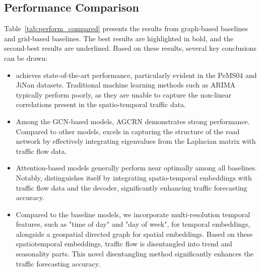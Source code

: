 \subsection{Performance Comparison}
Table~\ref{tab:perform_compared} presents the results from graph-based baselines and grid-based baselines. The best results are highlighted in bold, and the second-best results are underlined. Based on these results, several key conclusions can be drawn:
\begin{itemize}
    \item \model achieves state-of-the-art performance, particularly evident in the PeMS04 and JiNan datasets. Traditional machine learning methods such as ARIMA typically perform poorly, as they are unable to capture the non-linear correlations present in the spatio-temporal traffic data.%
    
    
    \item  Among the GCN-based models, AGCRN demonstrates strong performance. Compared to other models, \model excels in capturing the structure of the road network by effectively integrating eigenvalues from the Laplacian matrix with traffic flow data. 
    \item Attention-based models generally perform near optimally among all baselines. Notably, \model distinguishes itself by integrating spatio-temporal embeddings with traffic flow data and the decoder, significantly enhancing traffic forecasting accuracy.
    \item Compared to the baseline models, we incorporate multi-resolution temporal features, such as "time of day" and "day of week", for temporal embeddings, alongside a geospatial directed graph for spatial embeddings. Based on these spatiotemporal embeddings, traffic flow is disentangled into trend and seasonality parts. This novel disentangling method significantly enhances the traffic forecasting accuracy.
    
\end{itemize}

